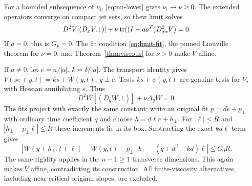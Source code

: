 For a bounded subsequence of $\nu_i$,
\eqref{eq:nu-lower} gives $\nu_i\to\nu\geq0$. The extended
operators converge on compact jet sets, so their limit solves
\[
 D^2V[(D_xV,1)]+\nu\operatorname{tr}((I-aa^T)D^2_{xx}V)=0.
\]
If $a=0$, this is $G_\nu=0$. The fit condition
\eqref{eq:limit-fit}, the pinned Liouville theorem for $\nu=0$,
and Theorem~\ref{thm:viscous} for $\nu>0$ make $V$ affine.

If $a\neq0$, let $e=a/|a|$, $k=\delta/|a|$. The transport identity
gives $V(se+y,t)=ks+W(y,t)$, $y\perp e$. Tests $ks+\psi(y,t)$
are genuine tests for $V$, with Hessian annihilating $e$. Thus
\[
 D^2W[(D_yW,1)]+\nu\Delta_yW=0.
\]
The fits project with exactly the same constant: write an original
fit $p=de+p_\perp$ with ordinary time coefficient $q$ and choose
$h=d\ell e+h_\perp$. For $|\ell|\leq R$ and
$|h_\perp-p_\perp\ell|\leq R$ these increments lie in its box.
Subtracting the exact $kd\ell$ term gives
\[
 |W(y+h_\perp,t+\ell)-W(y,t)-p_\perp\cdot h_\perp
                 -(q+d^2-kd)\ell|\leq C_0R.
\]
The same rigidity applies in the $n-1\geq1$ transverse dimensions.
This again makes $V$ affine, contradicting its construction. All
finite-viscosity alternatives, including near-critical original
slopes, are excluded.
